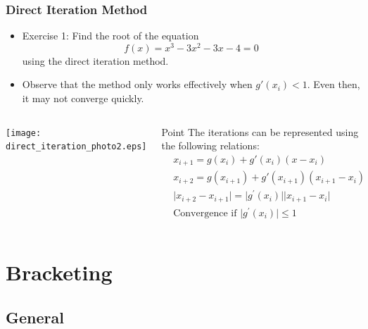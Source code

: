 \begin{frame}[fragile]
  \frametitle{Direct Iteration Method}

  \begin{itemize}
    \item Exercise 1: Find the root of the equation
          \[
            f(x) = x^3 -3x^2 - 3x - 4 = 0
          \]
          using the direct iteration method.
    \item Observe that the method only works effectively when \(g'(x_i) < 1\). Even then, it may not converge quickly.
  \end{itemize}
  \begin{columns}
    \texttt{[image: direct\_iteration\_photo2.eps]}
    \vspace{-0.5cm}
    \begin{block}{Point}
      The iterations can be represented using the following relations:
      \begin{align*}
         & x_{i+1} = g(x_i) + g'(x_i)(x - x_i)                                                        \\
         & x_{i+2} = g(x_{i+1}) + g'(x_{i+1})(x_{i+1} - x_i)                                          \\
         & \lvert x_{i+2} - x_{i+1} \rvert = \lvert g^\prime (x_i) \rvert \lvert x_{i+1} - x_i \rvert \\
         & \text{Convergence if } \lvert g^\prime (x_i) \rvert \leq 1
      \end{align*}
    \end{block}
  \end{columns}
\end{frame}

\section{Bracketing}
\subsection*{General}


